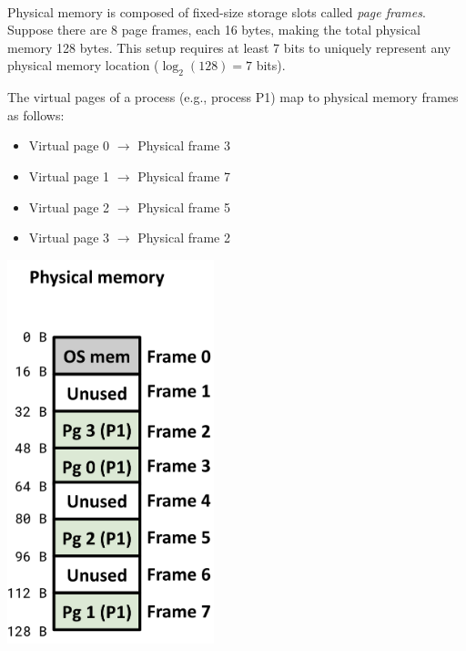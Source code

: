 \documentclass[../../compsys.tex]{subfiles}
\begin{document}
\begin{example}
\leavevmode
\\[2px]
Physical memory is composed of fixed-size storage slots called \textit{page frames}. Suppose there are 8 page frames, each 16 bytes, making the total physical memory 128 bytes. This setup requires at least 7 bits to uniquely represent any physical memory location ($\log_2(128) = 7$ bits). \\
\noindent
\begin{minipage}{0.45\textwidth}
The virtual pages of a process (e.g., process P1) map to physical memory frames as follows:\\

\begin{itemize}
  \item Virtual page 0 $\rightarrow$ Physical frame 3
  \item Virtual page 1 $\rightarrow$ Physical frame 7
  \item Virtual page 2 $\rightarrow$ Physical frame 5
  \item Virtual page 3 $\rightarrow$ Physical frame 2
\end{itemize}
\end{minipage}%
\hfill
\vline
\hfill
\begin{minipage}{0.45\textwidth}
\begin{center}
  \includegraphics[width=0.45\textwidth]{chapters/L5/images/paging-example2.png}
\end{center}
\end{minipage}
\\

\end{example}
\end{document}
